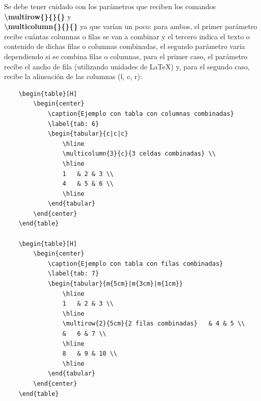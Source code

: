 Se debe tener cuidado con los parámetros que reciben los comandos \textbf{\textbackslash{multirow\{\}\{\}\{\}}} y \\ \textbf{\textbackslash{multicolumn\{\}\{\}\{\}}} ya que varían un poco: para ambos, el primer parámetro recibe cuántas columnas o filas se van a combinar y el tercero indica el texto o contenido de dichas filas o columnas combinadas, el segundo parámetro varia dependiendo si se combina filas o columnas, para el primer caso, el parámetro recibe el ancho de fila (utilizando unidades de \LaTeX) y, para el segundo caso, recibe la alineación de las columnas (l, c, r):
\begin{lstlisting}
    \begin{table}[H]
        \begin{center}
            \caption{Ejemplo con tabla con columnas combinadas}
            \label{tab: 6}
            \begin{tabular}{c|c|c}
                \hline
                \multicolumn{3}{c}{3 celdas combinadas} \\
                \hline
                1   & 2 & 3 \\
                4   & 5 & 6 \\
                \hline
            \end{tabular}
        \end{center}
    \end{table}
    
    \begin{table}[H]
        \begin{center}
            \caption{Ejemplo con tabla con filas combinadas}
            \label{tab: 7}
            \begin{tabular}{m{5cm}|m{3cm}|m{1cm}}
                \hline
                1   & 2 & 3 \\
                \hline
                \multirow{2}{5cm}{2 filas combinadas}   & 4 & 5 \\
                &   6 & 7 \\
                \hline
                8   & 9 & 10 \\
                \hline
            \end{tabular}
        \end{center}
    \end{table}
\end{lstlisting}

